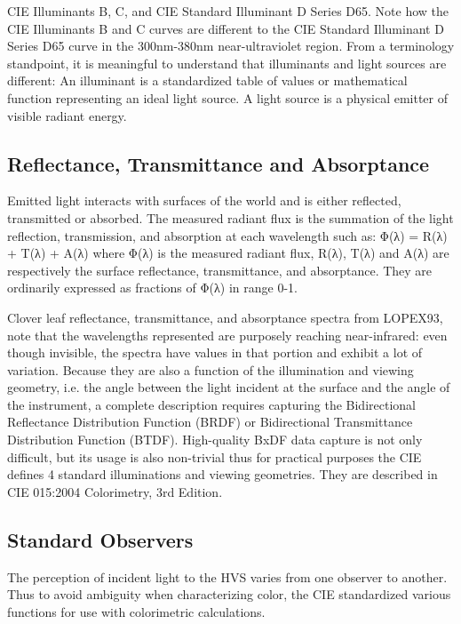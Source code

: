 CIE Illuminants B, C, and CIE Standard Illuminant D Series D65. Note how the CIE Illuminants B and C curves are different to the CIE Standard Illuminant D Series D65 curve in the 300nm-380nm near-ultraviolet region.
From a terminology standpoint, it is meaningful to understand that illuminants and light sources are different:
An illuminant is a standardized table of values or mathematical function representing an ideal light source.
A light source is a physical emitter of visible radiant energy.

\subsection{Reflectance, Transmittance and Absorptance}

Emitted light interacts with surfaces of the world and is either reflected, transmitted or absorbed. The measured radiant flux is the summation of the light reflection, transmission, and absorption at each wavelength such as:
Φ(λ) = R(λ) + T(λ) + A(λ)
where Φ(λ) is the measured radiant flux, R(λ), T(λ) and A(λ) are respectively the surface reflectance, transmittance, and absorptance. They are ordinarily expressed as fractions of Φ(λ) in range 0-1.

Clover leaf reflectance, transmittance, and absorptance spectra from LOPEX93, note that the wavelengths represented are purposely reaching near-infrared: even though invisible, the spectra have values in that portion and exhibit a lot of variation.
Because they are also a function of the illumination and viewing geometry, i.e. the angle between the light incident at the surface and the angle of the instrument, a complete description requires capturing the Bidirectional Reflectance Distribution Function (BRDF) or Bidirectional Transmittance Distribution Function (BTDF). High-quality BxDF data capture is not only difficult, but its usage is also non-trivial thus for practical purposes the CIE defines 4 standard illuminations and viewing geometries. They are described in CIE 015:2004 Colorimetry, 3rd Edition. 

\subsection{Standard Observers}

The perception of incident light to the HVS varies from one observer to another. Thus to avoid ambiguity when characterizing color, the CIE standardized various functions for use with colorimetric calculations.

